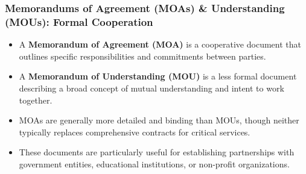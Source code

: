 \documentclass{beamer}
\begin{document}
\begin{frame}
    \frametitle{Memorandums of Agreement (MOAs) \& Understanding (MOUs): Formal Cooperation}
    
    \begin{itemize}
        \scriptsize
        \item A \textbf{Memorandum of Agreement (MOA)} is a cooperative document that outlines specific responsibilities and commitments between parties.
        \item A \textbf{Memorandum of Understanding (MOU)} is a less formal document describing a broad concept of mutual understanding and intent to work together.
        \item MOAs are generally more detailed and binding than MOUs, though neither typically replaces comprehensive contracts for critical services.
        \item These documents are particularly useful for establishing partnerships with government entities, educational institutions, or non-profit organizations.
    \end{itemize}
    
    \begin{center}
    \end{center}
\end{frame}
\end{document}

